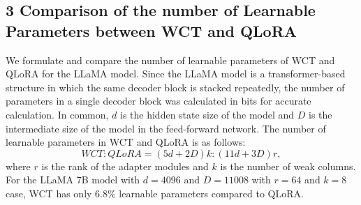 \documentclass[letterpaper]{article} %
\begin{document}
\subsection*{3 \quad Comparison of the number of Learnable Parameters between WCT and QLoRA}
We formulate and compare the number of learnable parameters of WCT and QLoRA for the LLaMA model.
Since the LLaMA model is a transformer-based structure in which the same decoder block is stacked repeatedly, the number of parameters in a single decoder block was calculated in bits for accurate calculation.
In common, $d$ is the hidden state size of the model and $D$ is the intermediate size of the model in the feed-forward network. 
The number of learnable parameters in WCT and QLoRA is as follows: 
\begin{equation}
WCT : QLoRA = (5d + 2D) k : (11d + 3D) r, 
\end{equation}
where $r$ is the rank of the adapter modules and $k$ is the number of weak columns. 
For the LLaMA 7B model with $d = 4096$ and $D = 11008$ with $r = 64$ and $k = 8$ case, WCT has only 6.8\% learnable parameters compared to QLoRA.
\end{document}
